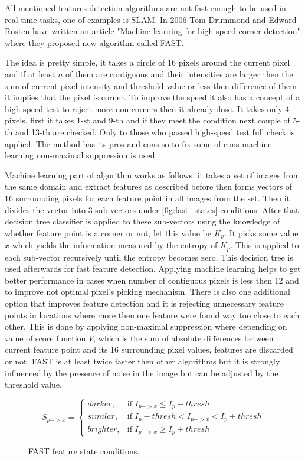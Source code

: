 \documentclass[../../../../main]{subfiles}
\begin{document}
All mentioned features detection algorithms are not fast enough to be used in real time tasks, one of examples is \ac{SLAM}. In 2006 Tom Drummond and Edward Rosten have written an article "Machine learning for high-speed corner detection" where they proposed new algorithm called \ac{FAST}.

The idea is pretty simple, it takes a circle of 16 pixels around the current pixel and if at least $n$ of them are contiguous and their intensities are larger then the sum of current pixel intensity and threshold value or less then difference of them it implies that the pixel is corner. To improve the speed it also has a concept of a high-speed test to reject more non-corners then it already dose. It takes only 4 pixels, first it takes 1-st and 9-th and if they meet the condition next couple of 5-th and 13-th are checked. Only to those who passed high-speed test full check is applied. The method has its pros and cons so to fix some of cons machine learning non-maximal suppression is used.

Machine learning part of algorithm works as follows, it takes a set of images from the same domain and extract features as described before then forms vectors of 16 surrounding pixels for each feature point in all images from the set. Then it divides the vector into 3 sub vectors under \ref{fig:fast_states} conditions. After that decision tree classifier is applied to these sub-vectors using the knowledge of whether feature point is a corner or not, let this value be $K_p$. It picks some value $x$ which yields the information measured by the entropy of $K_p$. This is applied to each sub-vector recursively until the entropy becomes zero. This decision tree is used afterwards for fast feature detection. Applying machine learning helps to get better performance in cases when number of contiguous pixels is less then 12 and to improve not optimal pixel's picking mechanism. There is also one additional option that improves feature detection and it is rejecting unnecessary feature points in locations where more then one feature were found way too close to each other. This is done by applying non-maximal suppression where depending on value of score function $V$, which is the sum of absolute differences between current feature point and its 16 surrounding pixel values, features are discarded or not. \ac{FAST} is at least twice faster then other algorithms but it is strongly influenced by the presence of noise in the image but can be adjusted by the threshold value.

\begin{figure} [!ht]
  \centering    
    \begin{equation}
        S_{p->x} = 
        \begin{cases} 
            darker, & \mbox{if } I_{p->x} \leq I_p-thresh \\
            similar, & \mbox{if } I_p-thresh < I_{p->x} < I_p+thresh\\
            brighter, & \mbox{if } I_{p->x} \geq I_p+thresh 
        \end{cases}
        \label{fig:fast_states}
    \end{equation}
  \caption{FAST feature state conditions.}
\end{figure}
\end{document}
